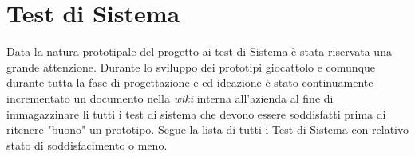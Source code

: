 
\chapter{Test di Sistema}
\label{cap:verifica-validazione}

Data la natura prototipale del progetto ai test di Sistema è stata riservata una grande attenzione. Durante lo sviluppo dei prototipi giocattolo e comunque durante tutta la fase di progettazione e ed ideazione è stato continuamente incrementato un documento nella \emph{wiki} interna all'azienda al fine di immagazzinare li tutti i test di sistema che devono essere soddisfatti prima di ritenere "buono" un prototipo.
Segue la lista di tutti i Test di Sistema con relativo stato di soddisfacimento o meno.

